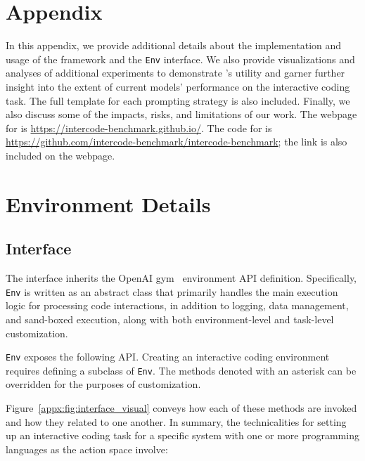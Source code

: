 \section*{Appendix}
\label{appx:intro}
In this appendix, we provide additional details about the implementation and usage of the \benchmark{} framework and the \texttt{\benchmark{}Env} interface. We also provide visualizations and analyses of additional experiments to demonstrate \benchmark{}'s utility and garner further insight into the extent of current models' performance on the interactive coding task. The full template for each prompting strategy is also included. Finally, we also discuss some of the impacts, risks, and limitations of our work. The webpage for \benchmark{} is \url{https://intercode-benchmark.github.io/}. The code for \benchmark{} is \url{https://github.com/intercode-benchmark/intercode-benchmark}; the link is also included on the \benchmark{} webpage.

\section{Environment Details}
\label{appx:env}

\subsection{\benchmark{} Interface}
\label{appx:env:interface}
The \benchmark{} interface inherits the OpenAI gym~\cite{openai_gym} environment API definition. 
Specifically, \texttt{\benchmark{}Env} is written as an abstract class that primarily handles the main execution logic for processing code interactions, in addition to logging, data management, and sand-boxed execution, along with both environment-level and task-level customization. 

\texttt{\benchmark{}Env} exposes the following API. Creating an interactive coding environment requires defining a subclass of \texttt{\benchmark{}Env}. The methods denoted with an asterisk can be overridden for the purposes of customization.





Figure~\ref{appx:fig:interface_visual} conveys how each of these methods are invoked and how they related to one another. In summary, the technicalities for setting up an interactive coding task for a specific system with one or more programming languages as the action space involve:

